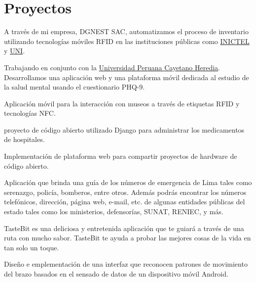 \section{Proyectos}

{A través de mi empresa, DGNEST SAC, automatizamos el proceso de inventario utilizando tecnologías móviles RFID en las instituciones públicas como \href{http://www.inictel-uni.edu.pe/}{INICTEL} y \href{http://en.wikipedia.org/wiki/National_University_of_Engineering}{UNI}.}   

{Trabajando en conjunto con la \href{http://www.upch.edu.pe/portal/}{Universidad Peruana Cayetano Heredia}. Desarrollamos una aplicación web y una plataforma móvil dedicada al estudio de la salud mental usando el cuestionario PHQ-9.}  

{Aplicación móvil para la interacción con museos a través de etiquetas RFID y tecnologías NFC.}  

{proyecto de código abierto utilizado Django para administrar los medicamentos de hospitales.}  

{Implementación de plataforma web para compartir proyectos de hardware de código abierto.}  

{Aplicación que brinda una guía de los números de emergencia de Lima tales como serenazgo, policía, bomberos, entre otros.
Además podrás encontrar los números telefónicos, dirección, página web, e-mail, etc. de algunas entidades públicas del estado tales como los ministerios, defensorías, SUNAT, RENIEC, y más.}  

{TasteBit es una deliciosa y entretenida aplicación que te guiará a través de una ruta con mucho sabor. 
TasteBit te ayuda a probar las mejores cosas de la vida en tan solo un toque.}  

{Diseño e emplementación de una interfaz que reconocen patrones de movimiento del brazo basados en el sensado de datos de un dispositivo móvil Android.}


